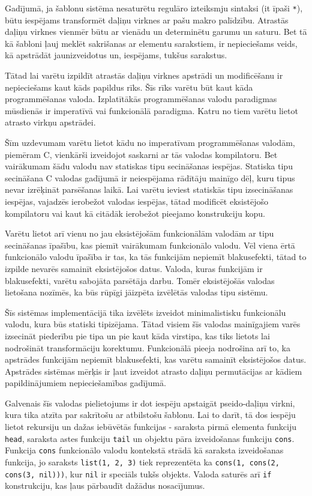 Gadījumā, ja šablonu sistēma nesaturētu regulāro izteiksmju sintaksi (it īpaši \verb|*|), būtu iespējams transformēt daļiņu virknes ar pašu makro palīdzību. Atrastās daļiņu virknes vienmēr būtu ar vienādu un determinētu garumu un saturu. Bet tā kā šabloni ļauj meklēt sakrišanas ar elementu sarakstiem, ir nepieciešams veids, kā apstrādāt jaunizveidotus un, iespējams, tukšus sarakstus.

Tātad lai varētu izpildīt atrastās daļiņu virknes apstrādi un modificēšanu ir nepieciešams kaut kāds papildus rīks. Šīs rīks varētu būt kaut kāda programmēšanas valoda. Izplatītākās programmēšanas valodu paradigmas mūsdienās ir imperatīvā  vai funkcionālā paradigma. Katru no tiem varētu lietot atrasto virkņu apstrādei.

Šīm uzdevumam varētu lietot kādu no imperatīvam programmēšanas valodām, piemēram C, vienkārši izveidojot saskarni ar tās valodas kompilatoru. Bet vairākumam šādu valodu nav statiskas tipu secināšanas iespējas. Statiska tipu secināšana C valodas gadījumā ir neiespējama rādītāju mainīgo dēļ, kuru tipus nevar izrēķināt parsēšanas laikā. Lai varētu ieviest statiskās tipu izsecināšanas iespējas, vajadzēs ierobežot valodas iespējas, tātad modificēt eksistējošo kompilatoru vai kaut kā citādāk ierobežot pieejamo konstrukciju kopu.

Varētu lietot arī vienu no jau eksistējošām funkcionālām valodām ar tipu secināšanas īpašību, kas piemīt vairākumam funkcionālo valodu. Vēl viena ērtā funkcionālo valodu īpašība ir tas, ka tās funkcijām nepiemīt blakusefekti, tātad to izpilde nevarēs samainīt eksistējošos datus. Valoda, kuras funkcijām ir blakusefekti, varētu sabojāta parsētāja darbu. Tomēr eksistējošās valodas lietošana nozīmēs, ka būs rūpīgi jāizpēta izvēlētās valodas tipu sistēmu.

Šīs sistēmas implementācijā tika izvēlēts izveidot minimalistisku funkcionālu valodu, kura būs statiski tipizējama. Tātad visiem šīs valodas mainīgajiem varēs izsecināt piederību pie tipa un pie kaut kāda virstipa, kas tiks lietots lai nodrošināt transformāciju korektumu. Funkcionālā pieeja nodrošina arī to, ka apstrādes funkcijām nepiemīt blakusefekti, kas varētu samainīt eksistējošos datus. Apstrādes sistēmas mērķis ir ļaut izveidot atrasto daļiņu permutācijas ar kādiem papildinājumiem nepieciešamības gadījumā.

Galvenais šīs valodas pielietojums ir dot iespēju apstaigāt pseido-daļiņu virkni, kura tika atzīta par sakrītošu ar atbilstošu šablonu. Lai to darīt, tā dos iespēju lietot rekursiju un dažas iebūvētās funkcijas - saraksta pirmā elementa funkciju \verb|head|, saraksta astes funkciju \verb|tail| un objektu pāra izveidošanas funkciju \verb|cons|. Funkcija \verb|cons| funkcionālo valodu kontekstā strādā kā saraksta izveidošanas funkcija, jo saraksts \verb|list(1, 2, 3)| tiek reprezentēta ka \verb|cons(1, cons(2, cons(3, nil)))|, kur \verb|nil| ir speciāls tukšs objekts. Valoda saturēs arī \verb|if| konstrukciju, kas ļaus pārbaudīt dažādus nosacījumus.

